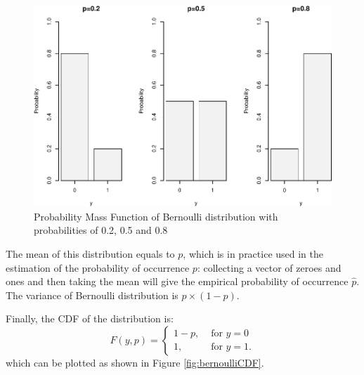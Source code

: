 \documentclass[
]{book}
\theoremstyle{definition}
\theoremstyle{definition}
\theoremstyle{definition}
\theoremstyle{definition}
\theoremstyle{remark}
\begin{document}
\begin{figure}
\centering
\includegraphics{Svetunkov---Statistics-for-Business-Analytics_files/figure-latex/bernoulliPMF-1.pdf}
\caption{\label{fig:bernoulliPMF}Probability Mass Function of Bernoulli distribution with probabilities of 0.2, 0.5 and 0.8}
\end{figure}

The mean of this distribution equals to \(p\), which is in practice used in the estimation of the probability of occurrence \(p\): collecting a vector of zeroes and ones and then taking the mean will give the empirical probability of occurrence \(\hat{p}\). The variance of Bernoulli distribution is \(p\times (1-p)\).

Finally, the CDF of the distribution is:
\begin{equation}
    F(y, p) = \left\{ \begin{aligned}
                            1-p, & \text{ for } y=0 \\
                            1,   & \text{ for } y=1 .
                    \end{aligned} \right.
    \label{eq:BernoulliCDF}
\end{equation}
which can be plotted as shown in Figure \ref{fig:bernoulliCDF}.
\end{document}
